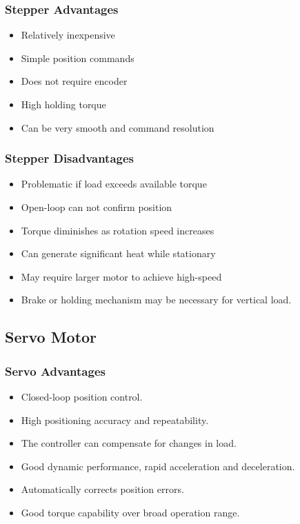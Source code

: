 \documentclass{article}
\begin{document}
\subsubsection{Stepper Advantages}

\begin{itemize}
    \item Relatively inexpensive  
    \item Simple position commands 
    \item Does not require encoder 
    \item High holding torque 
    \item Can be very smooth and command resolution 
\end{itemize}


\subsubsection{ Stepper Disadvantages}

\begin{itemize}
    \item Problematic if load exceeds available torque 
    \item Open-loop can not confirm position 
    \item Torque diminishes as rotation speed increases 
    \item Can generate significant heat while stationary 
    \item May require larger motor to achieve high-speed  
    \item Brake or holding mechanism may be necessary for vertical load. 
\end{itemize}

\subsection{Servo Motor}
\subsubsection{Servo Advantages}

\begin{itemize}
    \item Closed-loop position control.
    \item High positioning accuracy and repeatability.
    \item The controller can compensate for changes in load.
    \item Good dynamic performance, rapid acceleration and deceleration. 
    \item  Automatically corrects position errors. 
    \item  Good torque capability over broad operation range. 
\end{itemize}
\end{document}
